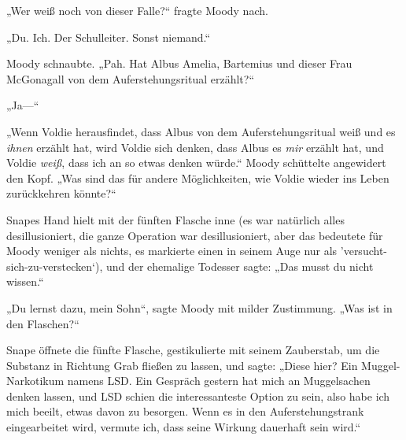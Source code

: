 „Wer weiß noch von dieser Falle?“ fragte Moody nach.

„Du. Ich. Der Schulleiter. Sonst niemand.“

Moody schnaubte. „Pah. Hat Albus Amelia, Bartemius und dieser Frau McGonagall von dem Auferstehungsritual erzählt?“

„Ja—“

„Wenn Voldie herausfindet, dass Albus von dem Auferstehungsritual weiß und es \emph{ihnen} erzählt hat, wird Voldie sich denken, dass Albus es \emph{mir} erzählt hat, und Voldie \emph{weiß}, dass ich an so etwas denken würde.“ Moody schüttelte angewidert den Kopf. „Was sind das für andere Möglichkeiten, wie Voldie wieder ins Leben zurückkehren könnte?“

Snapes Hand hielt mit der fünften Flasche inne (es war natürlich alles desillusioniert, die ganze Operation war desillusioniert, aber das bedeutete für Moody weniger als nichts, es markierte einen in seinem Auge nur als 'versucht-sich-zu-verstecken`), und der ehemalige Todesser sagte: „Das musst du nicht wissen.“

„Du lernst dazu, mein Sohn“, sagte Moody mit milder Zustimmung. „Was ist in den Flaschen?“

Snape öffnete die fünfte Flasche, gestikulierte mit seinem Zauberstab, um die Substanz in Richtung Grab fließen zu lassen, und sagte: „Diese hier? Ein Muggel-Narkotikum namens LSD. Ein Gespräch gestern hat mich an Muggelsachen denken lassen, und LSD schien die interessanteste Option zu sein, also habe ich mich beeilt, etwas davon zu besorgen. Wenn es in den Auferstehungstrank eingearbeitet wird, vermute ich, dass seine Wirkung dauerhaft sein wird.“

